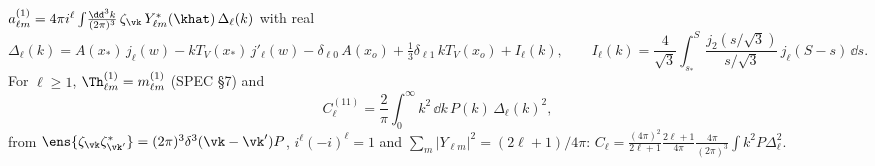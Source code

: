 \begin{proposition}\label{prop:Delta}
$a^{(1)}_{\ell m}=4\pi i^\ell\int\!\frac{\dd^3k}{(2\pi)^3}\,\zeta_\vk\,Y^*_{\ell m}(\khat)\,\Delta_\ell(k)$ with real
\begin{equation}
\Delta_\ell(k)=A(x_*)\,j_\ell(w)-kT_V(x_*)\,j'_\ell(w)-\delta_{\ell0}\,A(x_o)+\tfrac13\delta_{\ell1}\,kT_V(x_o)+I_\ell(k),
\qquad
I_\ell(k)=\frac{4}{\sqrt3}\int_{s_*}^{S}\frac{j_2(s/\sqrt3)}{s/\sqrt3}\,j_\ell(S-s)\,\dd s .
\end{equation}
For $\ell\ge1$, $\Th^{(1)}_{\ell m}=m^{(1)}_{\ell m}$ (SPEC \S7) and
\begin{equation}
C^{(11)}_\ell=\frac{2}{\pi}\int_0^\infty k^2\,\dd k\,P(k)\,\Delta_\ell(k)^2 ,
\end{equation}
from $\ens{\zeta_\vk\zeta^*_{\vk'}}=(2\pi)^3\delta^3(\vk-\vk')P$, $i^\ell(-i)^\ell=1$ and $\sum_m|Y_{\ell m}|^2=(2\ell+1)/4\pi$:
$C_\ell=\frac{(4\pi)^2}{2\ell+1}\frac{2\ell+1}{4\pi}\frac{4\pi}{(2\pi)^3}\int k^2P\Delta_\ell^2$.
\end{proposition}

